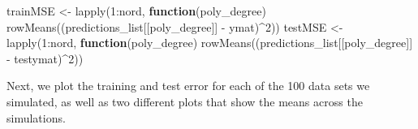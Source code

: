 \documentclass[
]{article}
\newenvironment{Shaded}{\begin{snugshade}}{\end{snugshade}}
\newcommand{\ControlFlowTok}[1]{\textcolor[rgb]{0.13,0.29,0.53}{\textbf{#1}}}
\newcommand{\DecValTok}[1]{\textcolor[rgb]{0.00,0.00,0.81}{#1}}
\newcommand{\FunctionTok}[1]{\textcolor[rgb]{0.00,0.00,0.00}{#1}}
\newcommand{\NormalTok}[1]{#1}
\newcommand{\OtherTok}[1]{\textcolor[rgb]{0.56,0.35,0.01}{#1}}
\newcommand{\SpecialCharTok}[1]{\textcolor[rgb]{0.00,0.00,0.00}{#1}}
\begin{document}
\begin{Shaded}
\begin{Highlighting}[]
\NormalTok{trainMSE }\OtherTok{\textless{}{-}} \FunctionTok{lapply}\NormalTok{(}\DecValTok{1}\SpecialCharTok{:}\NormalTok{nord, }\ControlFlowTok{function}\NormalTok{(poly\_degree) }\FunctionTok{rowMeans}\NormalTok{((predictions\_list[[poly\_degree]] }\SpecialCharTok{{-}}\NormalTok{ ymat)}\SpecialCharTok{\^{}}\DecValTok{2}\NormalTok{))}
\NormalTok{testMSE }\OtherTok{\textless{}{-}} \FunctionTok{lapply}\NormalTok{(}\DecValTok{1}\SpecialCharTok{:}\NormalTok{nord, }\ControlFlowTok{function}\NormalTok{(poly\_degree) }\FunctionTok{rowMeans}\NormalTok{((predictions\_list[[poly\_degree]] }\SpecialCharTok{{-}}\NormalTok{ testymat)}\SpecialCharTok{\^{}}\DecValTok{2}\NormalTok{))}
\end{Highlighting}
\end{Shaded}

Next, we plot the training and test error for each of the 100 data sets
we simulated, as well as two different plots that show the means across
the simulations.
\end{document}
